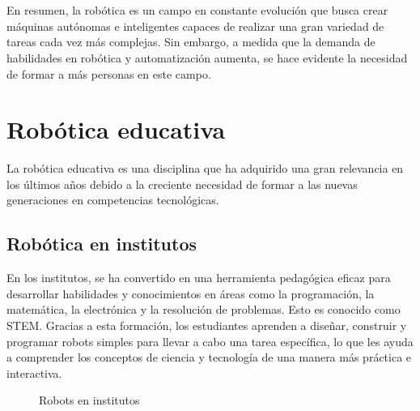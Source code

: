 \section*{}
En resumen, la robótica es un campo en constante evolución que busca crear máquinas autónomas e inteligentes capaces de realizar una gran variedad de tareas cada vez 
más complejas. Sin embargo, a medida que la demanda de habilidades en robótica y automatización aumenta, se hace evidente la necesidad de formar a más personas en este campo.

\newpage
\section{Robótica educativa}
La robótica educativa es una disciplina que ha adquirido una gran relevancia en los últimos años debido a la creciente necesidad de formar a las nuevas generaciones en
competencias tecnológicas.

\label{sec:rob_educativa}
\subsection{Robótica en institutos}
En los institutos, se ha convertido en una herramienta pedagógica eficaz para desarrollar habilidades y conocimientos en áreas como la programación, 
la matemática, la electrónica y la resolución de problemas. Esto es conocido como \ac{STEM}. Gracias a esta formación, los 
estudiantes aprenden a diseñar, construir y programar robots simples para llevar a cabo una tarea específica, lo que les ayuda a comprender  
los conceptos de ciencia y tecnología de una manera más práctica e interactiva.\\
\begin{figure} [ht!]
  \centering    
  \hspace{1cm}
  \caption{Robots en institutos}
\end{figure}

